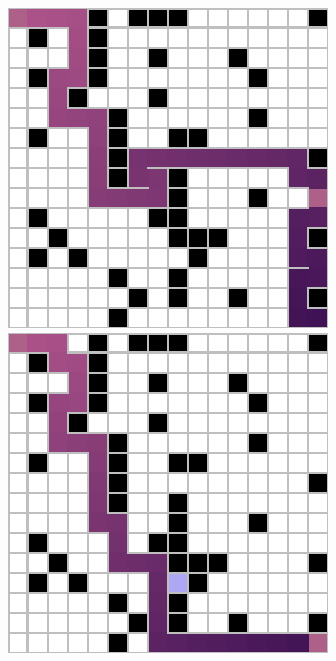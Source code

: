 \documentclass[letter]{article}
\begin{document}
\begin{questions}
	\begin{figure}
		\includegraphics[width=\linewidth]{../pics/16/DFS distinctFringe 43 43 43.png}
		\caption{}\label{fig:q2-10}
		\endminipage\hfill
		\includegraphics[width=\linewidth]{../pics/16/DFS quickGoal randomWalk distinctFringe 34 33 31.png}

\end{figure}
\end{questions}
\end{document}
